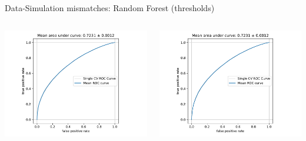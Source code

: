 \begin{frame}[t]{Data-Simulation mismatches: Random Forest (thresholds)}
\begin{columns}[onlytextwidth]
    \begin{column}{0.5\textwidth}
        \includegraphics[width=\textwidth,page=1]{fig/data_mc_separation_thresholds.pdf}
    \end{column}
    \begin{column}{0.5\textwidth}
        \includegraphics[width=\textwidth,page=2]{fig/data_mc_separation_thresholds.pdf}
    \end{column}
\end{columns}
\end{frame}

